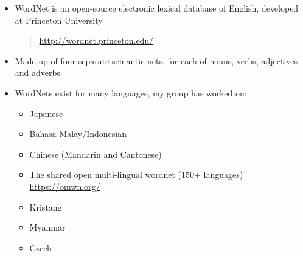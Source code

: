 \documentclass[a4paper,landscape,headrule,footrule,xetex]{foils}
\begin{document}
\begin{itemize}
\item WordNet is an open-source electronic lexical database of English,
  developed at Princeton University
  \begin{quote}
    \url{http://wordnet.princeton.edu/}
  \end{quote}
\item Made up of four separate semantic nets, for each of nouns, verbs,
  adjectives and adverbs
\item WordNets exist for many languages, my group has worked on:
  \begin{itemize}
  \item Japanese 
  \item Bahasa Malay/Indonesian
  \item Chinese (Mandarin and Cantonese)
  \item The shared open multi-lingual wordnet (150+ languages) 
    \\ \url{https://omwn.org/}
  \item Kristang
  \item Myanmar
  \item Czech
\end{itemize}
\end{itemize}
\end{document}
